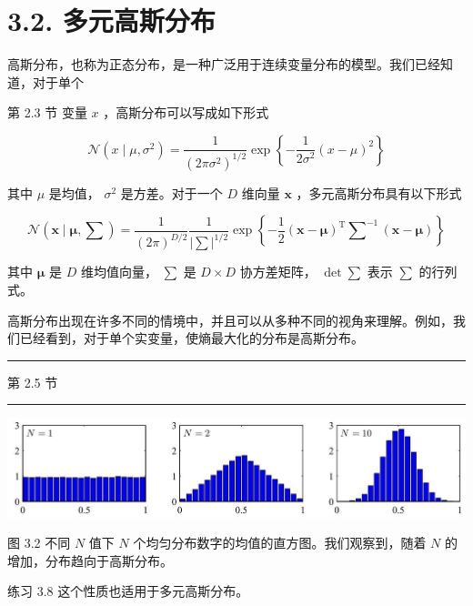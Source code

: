 \documentclass[10pt]{article}
\newcommand{\HRule}{\begin{center}\rule{0.9\linewidth}{0.2mm}\end{center}}
\begin{document}
\section*{3.2. 多元高斯分布}

高斯分布，也称为正态分布，是一种广泛用于连续变量分布的模型。我们已经知道，对于单个

第 2.3 节 变量 \(x\) ，高斯分布可以写成如下形式

\[
\mathcal{N}\left( {x \mid  \mu ,{\sigma }^{2}}\right)  = \frac{1}{{\left( 2\pi {\sigma }^{2}\right) }^{1/2}}\exp \left\{  {-\frac{1}{2{\sigma }^{2}}{\left( x - \mu \right) }^{2}}\right\}   \tag{3.25}
\]

其中 \(\mu\) 是均值， \({\sigma }^{2}\) 是方差。对于一个 \(D\) 维向量 \(\mathbf{x}\) ，多元高斯分布具有以下形式

\[
\mathcal{N}\left( {\mathbf{x} \mid  \mathbf{\mu },\mathbf{\sum }}\right)  = \frac{1}{{\left( 2\pi \right) }^{D/2}}\frac{1}{{\left| \mathbf{\sum }\right| }^{1/2}}\exp \left\{  {-\frac{1}{2}{\left( \mathbf{x} - \mathbf{\mu }\right) }^{\mathrm{T}}{\mathbf{\sum }}^{-1}\left( {\mathbf{x} - \mathbf{\mu }}\right) }\right\}   \tag{3.26}
\]

其中 \(\mathbf{\mu }\) 是 \(D\) 维均值向量， \(\mathbf{\sum }\) 是 \(D \times  D\) 协方差矩阵， \(\det \mathbf{\sum }\) 表示 \(\mathbf{\sum }\) 的行列式。

高斯分布出现在许多不同的情境中，并且可以从多种不同的视角来理解。例如，我们已经看到，对于单个实变量，使熵最大化的分布是高斯分布。

\HRule

第 2.5 节

\HRule

\begin{center}
\includegraphics[max width=1.0\textwidth]{images/0194e279-9b28-703a-88f4-c3ac21e2010d_90_224_358_1299_282_0.jpg}
\end{center}
\hspace*{3em} 

图 3.2 不同 \(N\) 值下 \(N\) 个均匀分布数字的均值的直方图。我们观察到，随着 \(N\) 的增加，分布趋向于高斯分布。

练习 3.8 这个性质也适用于多元高斯分布。
\end{document}
